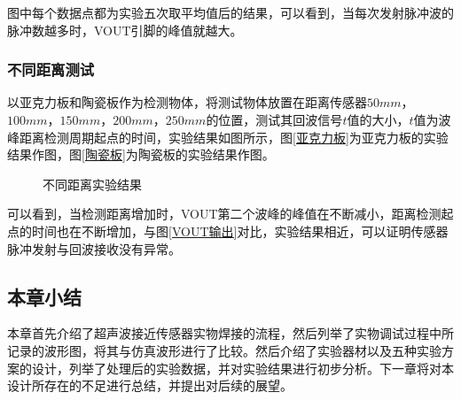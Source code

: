 图中每个数据点都为实验五次取平均值后的结果，可以看到，当每次发射脉冲波的脉冲数越多时，VOUT引脚的峰值就越大。

\subsubsection{不同距离测试}
以亚克力板和陶瓷板作为检测物体，将测试物体放置在距离传感器$50mm$，$100mm$，$150mm$，$200mm$，$250mm$的位置，测试其回波信号$t$值的大小，$t$值为波峰距离检测周期起点的时间，实验结果如图所示，图\ref{亚克力板}为亚克力板的实验结果作图，图\ref{陶瓷板}为陶瓷板的实验结果作图。
\begin{figure}[!h]
	\centering
	\caption{不同距离实验结果}
	\label{不同距离实验结果}
\end{figure}
可以看到，当检测距离增加时，VOUT第二个波峰的峰值在不断减小，距离检测起点的时间也在不断增加，与图\ref{VOUT输出}对比，实验结果相近，可以证明传感器脉冲发射与回波接收没有异常。
\subsection{本章小结}
本章首先介绍了超声波接近传感器实物焊接的流程，然后列举了实物调试过程中所记录的波形图，将其与仿真波形进行了比较。然后介绍了实验器材以及五种实验方案的设计，列举了处理后的实验数据，并对实验结果进行初步分析。下一章将对本设计所存在的不足进行总结，并提出对后续的展望。







